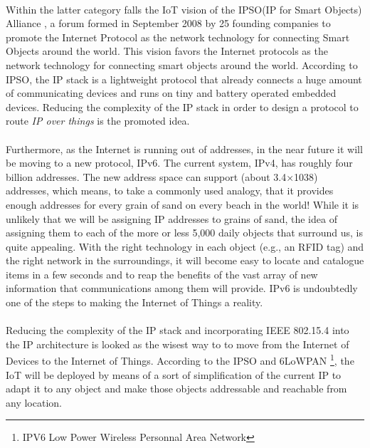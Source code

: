 \documentclass[10pt, twocolumn]{article}
\begin{document}
\paragraph{}
Within the latter category falls the IoT vision of the IPSO(IP for Smart Objects) Alliance \cite{ref8}, a forum formed in September 2008 by 25 founding companies to promote the Internet Protocol as the network technology for connecting Smart Objects around the world.
This vision favors the Internet protocols as the network technology for connecting smart objects around the world.
According to IPSO, the IP stack is a lightweight protocol that already connects a huge amount of communicating devices and runs on tiny and battery operated embedded devices. Reducing the complexity of the IP stack in order to design a protocol to route \emph{IP over things} is the promoted idea.
\paragraph{}
Furthermore, as the Internet is running out of addresses, in the near future it will be moving to a new protocol, IPv6. The current system, IPv4, has roughly four billion addresses. The new address space can support (about 3.4×1038) addresses, which means, to take a commonly used analogy, that it provides enough addresses for every grain of sand on every beach in the world! While it is unlikely that we will be assigning IP addresses to grains of sand, the idea of assigning them to each of the more or less 5,000 daily objects that surround us, is quite appealing. With the right technology in each object (e.g., an RFID tag) and the right network in the surroundings, it will become easy to locate and catalogue items in a few seconds and to reap the benefits of the vast array of new information that communications among them will provide. IPv6 is undoubtedly one of the steps to making the Internet of Things a reality\cite{ref15}. 
\paragraph{}
Reducing the complexity of the IP stack and incorporating IEEE 802.15.4 into the IP architecture is looked as the wisest way to to move from the Internet of Devices to the Internet of Things. According to the IPSO and 6LoWPAN \footnote{IPV6 Low Power Wireless Personnal Area Network}, the IoT will be deployed by means of a sort of simplification of the current IP to adapt it to any object and make those objects addressable and reachable from any location.
\end{document}
